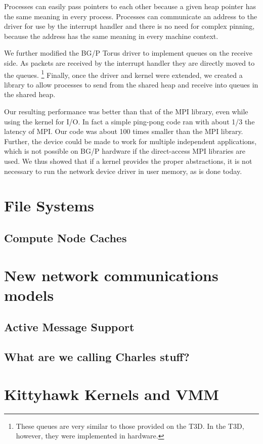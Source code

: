 Processes can easily pass pointers to each other because 
a given heap pointer has the same meaning in every process. Processes can communicate an address 
to the driver for use by the interrupt handler and there is no need for complex pinning, because the 
address has the same meaning in every machine context. 

We further modified the BG/P Torus driver to implement queues on the receive side. As packets are 
received  by the interrupt handler they are directly moved to the queues. 
\footnote{These queues are 
very similar to those provided on the T3D. In the T3D, however, they were implemented in hardware. }
Finally, once the driver and kernel were extended, we created a library to allow processes to 
send from the shared heap and receive into queues in the shared heap. 

Our resulting performance was better than that of the MPI library, even while using 
the kernel for I/O. In fact a simple ping-pong code ran with about 1/3 the latency 
of MPI. Our code was about 100 times smaller than the MPI library. Further, 
the device could be made to work for multiple independent applications, which is not possible
on BG/P hardware if the direct-access MPI libraries are used. We thus showed that if a 
kernel provides the proper abstractions, it is not necessary to run the network device driver
in user memory, as is done today. 

\section{File Systems}
\subsection{Compute Node Caches}
\section{New network communications models}
\subsection{Active Message Support}
\subsection{What are we calling Charles stuff?}
\section{Kittyhawk Kernels and VMM}

